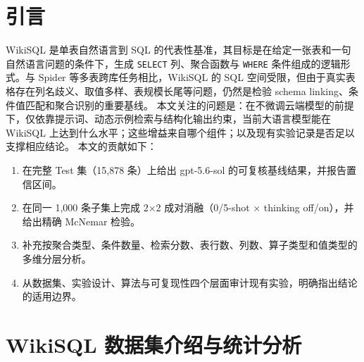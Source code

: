 \documentclass[conference]{IEEEtran}
\begin{document}
\section{引言}
WikiSQL 是单表自然语言到 SQL 的代表性基准，其目标是在给定一张表和一句自然语言问题的条件下，生成 \texttt{SELECT} 列、聚合函数与 \texttt{WHERE} 条件组成的逻辑形式。与 Spider 等多表跨库任务相比，WikiSQL 的 SQL 空间受限，但由于真实表格存在列名歧义、取值多样、表规模长尾等问题，仍然是检验 schema linking、条件值匹配和聚合识别的重要基线。
本文关注的问题是：在不微调云端模型的前提下，仅依靠提示词、动态示例检索与结构化输出约束，当前大语言模型能在 WikiSQL 上达到什么水平；这些增益来自哪个组件；以及现有实验记录是否足以支撑相应结论。
本文的贡献如下：
\begin{enumerate}
\item 在完整 Test 集（15,878 条）上给出 gpt-5.6-sol 的可复核基线结果，并报告置信区间。
\item 在同一 1,000 条子集上完成 2×2 成对消融（0/5-shot × thinking off/on），并给出精确 McNemar 检验。
\item 补充按聚合类型、条件数量、检索分数、表行数、列数、算子类型和值类型的多维分层分析。
\item 从数据集、实验设计、算法与可复现性四个层面审计现有实验，明确指出结论的适用边界。
\end{enumerate}
\section{WikiSQL 数据集介绍与统计分析}
\end{document}
